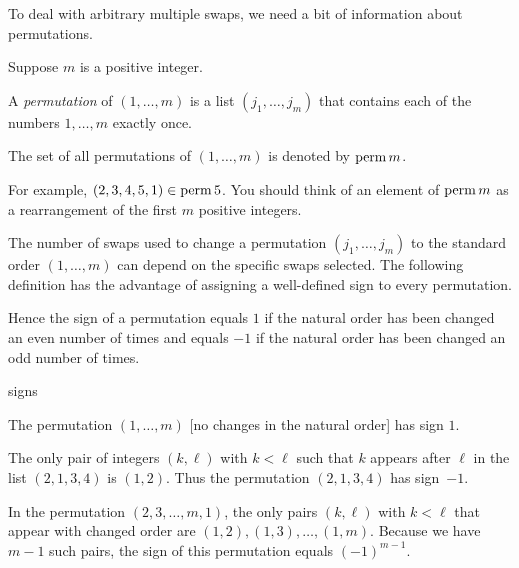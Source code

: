 To deal with arbitrary multiple swaps, we need a bit of information about permutations.

{Suppose $m$ is a positive integer.
\begin{Itemize}
\item
A \emph{permutation} of
$(1, \ldots, m)$ is a list $(j_1, \ldots, j_m)$ that contains each of the numbers $1, \ldots, m$ exactly once.
\item
The set of all permutations of $(1, \ldots, m)$ is denoted by $\operatorname{perm} m$.
\end{Itemize}}

For example, $(2, 3, 4, 5, 1) \in \operatorname{perm} 5$. You should think of an
element of $\operatorname{perm} m$ as a rearrangement of the first $m$ positive integers.

The number of swaps used to change a permutation $(j_1, \ldots, j_m)$ to the standard order $(1, \ldots, m)$ can depend on the specific swaps selected. The following definition has the advantage of assigning a well-defined sign to every permutation.


Hence the sign of a permutation equals $1$ if the natural order has been changed an even number of
times and equals $-1$ if the natural order has been changed an odd number of times.

\begin{example}{signs}
\vspace{-.09in} %
\begin{Itemize}
\item
The permutation $(1, \ldots, m)$ [no changes in the natural order] has sign $1$.
\item
The only pair of integers $(k, \ell)$ with $k < \ell$ such that $k$ appears after $\ell$ in the list $(2, 1, 3, 4)$ is $(1, 2)$. Thus the permutation $(2, 1, 3, 4)$ has sign~$-1$.
\item
In the permutation $(2, 3, \ldots, m, 1)$, the only pairs $(k, \ell)$ with $k < \ell$ that appear with changed order are
$(1, 2), (1, 3), \ldots, (1,m)$. Because we have $m-1$ such pairs, the sign of this permutation equals $(-1)^{m-1}$.
\end{Itemize}
\exampleitemend
\end{example}

